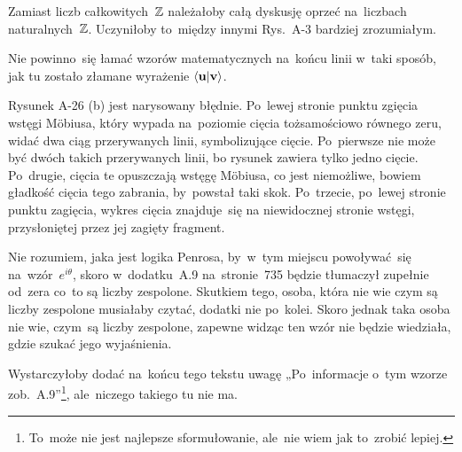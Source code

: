 \documentclass[a4paper,11pt]{article}
\begin{document}
\vspace{\spaceFour}





\noindent
{} Zamiast liczb całkowitych~$\mathbb{Z}$ należałoby całą
dyskusję oprzeć na~liczbach naturalnych~$\mathbb{Z}$. Uczyniłoby to~między
innymi Rys.~A-3 bardziej zrozumiałym.

\vspace{\spaceFour}





\noindent
{} Nie powinno~się łamać wzorów matematycznych
na~końcu linii w~taki sposób, jak tu zostało złamane wyrażenie
$\langle \mathbf{u} | \mathbf{v} \rangle$.

\vspace{\spaceFour}





\noindent
{} Rysunek A-26 (b) jest narysowany błędnie. Po~lewej stronie punktu
zgięcia wstęgi M\"{o}biusa, który wypada na~poziomie cięcia tożsamościowo
równego zeru, widać dwa ciąg przerywanych linii, symbolizujące cięcie.
Po~pierwsze nie może być dwóch takich przerywanych linii, bo rysunek
zawiera tylko jedno cięcie. Po~drugie, cięcia te opuszczają wstęgę
M\"{o}biusa, co jest niemożliwe, bowiem gładkość cięcia tego zabrania,
by~powstał taki skok. Po~trzecie, po~lewej stronie punktu zagięcia, wykres
cięcia znajduje~się na niewidocznej stronie wstęgi, przysłoniętej przez jej
zagięty fragment.

\vspace{\spaceFour}





\noindent
{} Nie rozumiem, jaka jest logika Penrosa, by~w~tym
miejscu powoływać~się na~wzór~$e^{ i \theta }$, skoro w~dodatku~A.9
na~stronie~735 będzie tłumaczył zupełnie od~zera co~to są liczby
zespolone. Skutkiem tego, osoba, która nie wie czym są liczby
zespolone musiałaby czytać, dodatki nie po~kolei. Skoro jednak taka
osoba nie wie, czym~są liczby zespolone, zapewne widząc ten wzór nie
będzie wiedziała, gdzie szukać jego wyjaśnienia.

Wystarczyłoby dodać na~końcu tego tekstu uwagę „Po~informacje o~tym
wzorze zob.~A.9”\footnote{To~może nie jest najlepsze sformułowanie,
  ale~nie wiem jak to~zrobić lepiej.}, ale~niczego takiego tu nie ma.

\vspace{\spaceFour}
\end{document}

